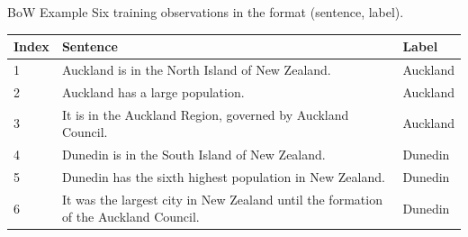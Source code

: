 \documentclass[aspectratio=169, 10pt]{beamer}
\begin{document}
\begin{frame}{BoW Example}
    Six training observations in the format (sentence, label).

    \begin{table}[]
        \small
        \begin{tabular}{l|l|l}
        \textbf{Index} & \textbf{Sentence}                                                                     & \textbf{Label} \\ \hline
        1              & Auckland is in the North Island of New Zealand.                                       & Auckland       \\
        2              & Auckland has a large population.                                                      & Auckland       \\
        3              & It is in the Auckland Region, governed by Auckland Council.                           & Auckland       \\
        4              & Dunedin is in the South Island of New Zealand.                                        & Dunedin        \\
        5              & Dunedin has the sixth highest population in New Zealand.                              & Dunedin        \\
        6              & It was the largest city in New Zealand until the formation of the   Auckland Council. & Dunedin       
        \end{tabular}
    \end{table}
\end{frame}
\end{document}
